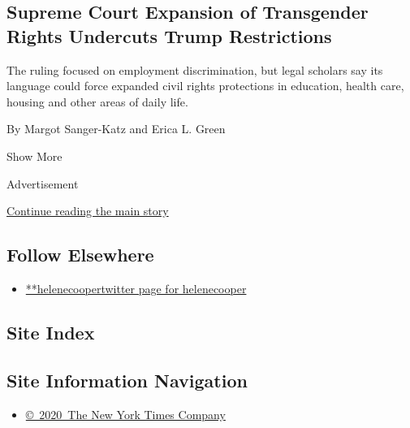 \begin{enumerate}
{  \subsection{Supreme Court Expansion of Transgender Rights Undercuts
  Trump
  Restrictions}\label{supreme-court-expansion-of-transgender-rights-undercuts-trump-restrictions}}

  The ruling focused on employment discrimination, but legal scholars
  say its language could force expanded civil rights protections in
  education, health care, housing and other areas of daily life.

  By Margot Sanger-Katz and Erica L. Green
\end{enumerate}

Show More

Advertisement

\protect\hyperlink{after-mid2}{Continue reading the main story}

\hypertarget{follow-elsewhere}{%
\subsection{Follow Elsewhere}\label{follow-elsewhere}}

\begin{itemize}
\tightlist
\item
  \href{https://twitter.com/helenecooper}{**helenecoopertwitter page for
  helenecooper}
\end{itemize}

\hypertarget{site-index}{%
\subsection{Site Index}\label{site-index}}

\hypertarget{site-information-navigation}{%
\subsection{Site Information
Navigation}\label{site-information-navigation}}

\begin{itemize}
\tightlist
\item
  \href{https://help.nytimes.com/hc/en-us/articles/115014792127-Copyright-notice}{©~2020~The
  New York Times Company}
\end{itemize}

